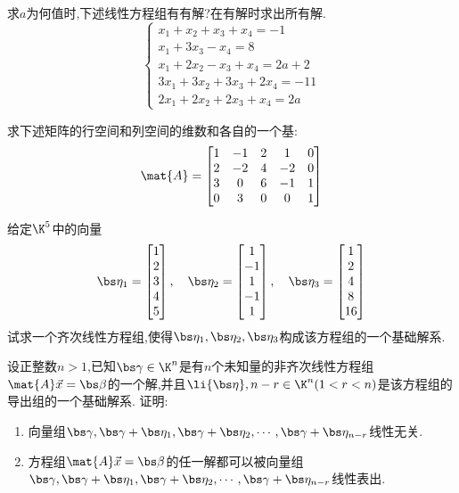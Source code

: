 \documentclass{ctexart}
\begin{document}
\pagestyle{empty}
\begin{center}
\end{center}
\begin{homework}[1(20')]
    求$a$为何值时,下述线性方程组有有解?在有解时求出所有解.
    \[\left\{\begin{array}{l}
        x_1+x_2+x_3+x_4=-1\\
        x_1+3x_3-x_4=8\\
        x_1+2x_2-x_3+x_4=2a+2\\
        3x_1+3x_2+3x_3+2x_4=-11\\
        2x_1+2x_2+2x_3+x_4=2a
    \end{array}\right.\]
\end{homework}
\begin{homework}[2(20')]
    求下述矩阵的行空间和列空间的维数和各自的一个基:
    \[\mat{A}=\begin{bmatrix}
        1&-1&2&1&0\\
        2&-2&4&-2&0\\
        3&0&6&-1&1\\
        0&3&0&0&1
    \end{bmatrix}\]
\end{homework}
\begin{homework}[3(20')]
    给定$\K^5$中的向量
    \[\bs\eta_1=\begin{bmatrix}
        1\\2\\3\\4\\5
    \end{bmatrix},\quad\bs\eta_2=\begin{bmatrix}
        1\\-1\\1\\-1\\1
    \end{bmatrix},\quad\bs\eta_3=\begin{bmatrix}
        1\\2\\4\\8\\16
    \end{bmatrix}\]
    试求一个齐次线性方程组,使得$\bs\eta_1,\bs\eta_2,\bs\eta_3$构成该方程组的一个基础解系.
\end{homework}
\begin{homework}[4(10')]
    设正整数$n>1$,已知$\bs\gamma\in\K^n$是有$n$个未知量的非齐次线性方程组$\mat{A}\vec{x}=\bs\beta$的一个解,并且$\li{\bs\eta},{n-r}\in\K^n(1<r<n)$是该方程组的导出组的一个基础解系.
    证明:
    \begin{enumerate}
        \item 向量组$\bs\gamma,\bs\gamma+\bs\eta_1,\bs\gamma+\bs\eta_2,\cdots,\bs\gamma+\bs\eta_{n-r}$线性无关.
        \item 方程组$\mat{A}\vec{x}=\bs\beta$的任一解都可以被向量组$\bs\gamma,\bs\gamma+\bs\eta_1,\bs\gamma+\bs\eta_2,\cdots,\bs\gamma+\bs\eta_{n-r}$线性表出.
    \end{enumerate}
\end{homework}
\end{document}
